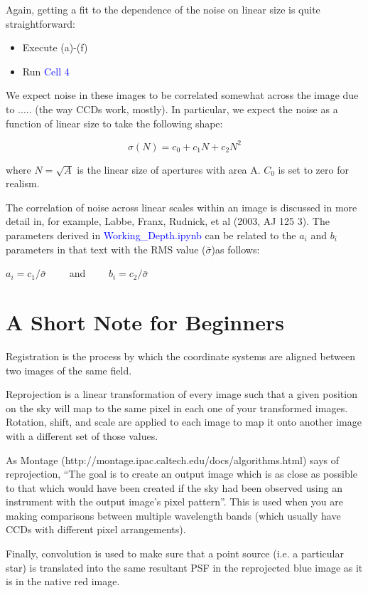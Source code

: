 \documentclass[a4paper,10pt]{article}
\begin{document}
Again, getting a fit to the dependence of the noise on linear size is quite straightforward:
\begin{itemize}
 \item Execute (a)-(f)
 \item Run \textcolor{blue}{Cell 4}
\end{itemize}

We expect noise in these images to be correlated somewhat across the image due to ..... (the way CCDs work, mostly). In particular, we expect the noise as a function of linear size to take the following shape:

\begin{equation}
 \sigma(N) = c_{0} + c_{1}N + c_{2}N^{2}
\end{equation}

where $N=\sqrt{A}$ is the linear size of apertures with area A. $C_{0}$ is set to zero for realism.

 The correlation of noise across linear scales within an image is discussed in more detail in, for example, Labbe, Franx, Rudnick, et al (2003, AJ 125 3). The parameters derived in \textcolor{blue}{Working\_Depth.ipynb} can be related to the $a_{i}$ and $b_{i}$ parameters in that text with the RMS value ($\bar{\sigma}$)as follows:


\centerline{$a_{i} = c_{1}/\bar{\sigma}$  \ \ \ \  and \ \ \ \ $b_{i} = c_{2}/\bar{\sigma}$}








\section*{A Short Note for Beginners}

Registration is the process by which the coordinate systems are aligned between two images of the same field. 

Reprojection is a linear transformation of every image such that a given position on the sky will map to the same pixel in each one of your transformed images. Rotation, shift, and scale are applied to each image to map it onto another image with a different set of those values.  

As Montage (http://montage.ipac.caltech.edu/docs/algorithms.html) says of reprojection, ``The goal is to create an output image which is as close as possible to that which would have been created if the sky had been observed using an instrument with the output image's pixel pattern''. This is used when you are making comparisons between multiple wavelength bands (which usually have CCDs with different pixel arrangements). 

Finally, convolution is used to make sure that a point source (i.e. a particular star) is translated into the same resultant PSF in the reprojected blue image as it is in the native red image. 
\end{document}
